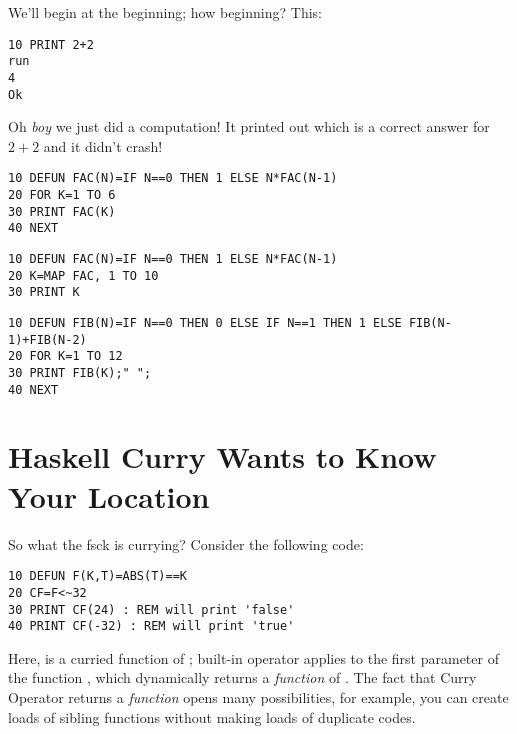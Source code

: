 \quad
{}

We'll begin at the beginning; how beginning? This:

\begin{lstlisting}
10 PRINT 2+2
run
4
Ok
\end{lstlisting}

Oh \emph{boy} we just did a computation! It printed out  which is a correct answer for $2+2$ and it didn't crash!

\begin{lstlisting}
10 DEFUN FAC(N)=IF N==0 THEN 1 ELSE N*FAC(N-1)
20 FOR K=1 TO 6
30 PRINT FAC(K)
40 NEXT
\end{lstlisting}

\begin{lstlisting}
10 DEFUN FAC(N)=IF N==0 THEN 1 ELSE N*FAC(N-1)
20 K=MAP FAC, 1 TO 10
30 PRINT K
\end{lstlisting}


\begin{lstlisting}
10 DEFUN FIB(N)=IF N==0 THEN 0 ELSE IF N==1 THEN 1 ELSE FIB(N-1)+FIB(N-2)
20 FOR K=1 TO 12
30 PRINT FIB(K);" ";
40 NEXT
\end{lstlisting}

\section[Currying]{Haskell Curry Wants to Know Your Location}
\label{currying101}

So what the fsck is currying? Consider the following code:

\begin{lstlisting}
10 DEFUN F(K,T)=ABS(T)==K
20 CF=F<~32
30 PRINT CF(24) : REM will print 'false'
40 PRINT CF(-32) : REM will print 'true'
\end{lstlisting}

Here,  is a curried function of ; built-in operator \code{$<\!\sim$} applies  to the first parameter of the function , which dynamically returns a \emph{function} of . The fact that Curry Operator returns a \emph{function} opens many possibilities, for example, you can create loads of sibling functions without making loads of duplicate codes.

